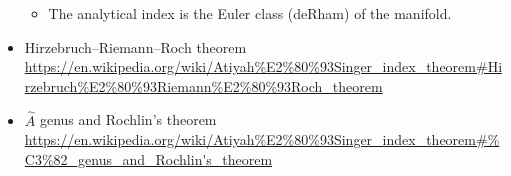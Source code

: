 \documentclass{article}
\begin{document}
\begin{itemize}
\begin{itemize}
        \item The analytical index is the Euler class (deRham) of the manifold.
        \end{itemize}
    
    \item Hirzebruch–Riemann–Roch theorem \url{https://en.wikipedia.org/wiki/Atiyah\%E2\%80\%93Singer_index_theorem#Hirzebruch\%E2\%80\%93Riemann\%E2\%80\%93Roch_theorem}
    
    \item $\hat A$ genus and Rochlin's theorem \url{https://en.wikipedia.org/wiki/Atiyah\%E2\%80\%93Singer_index_theorem#\%C3\%82_genus_and_Rochlin's_theorem}

\end{itemize}
\end{document}
